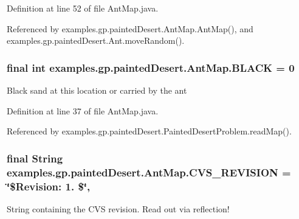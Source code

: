 Definition at line 52 of file Ant\-Map.\-java.



Referenced by examples.\-gp.\-painted\-Desert.\-Ant\-Map.\-Ant\-Map(), and examples.\-gp.\-painted\-Desert.\-Ant.\-move\-Random().

\hypertarget{classexamples_1_1gp_1_1painted_desert_1_1_ant_map_a93de6de82fae66c7bf8423d40669ece8}{
\subsubsection[{B\-L\-A\-C\-K}]{\setlength{\rightskip}{0pt plus 5cm}final int examples.\-gp.\-painted\-Desert.\-Ant\-Map.\-B\-L\-A\-C\-K = 0\hspace{0.3cm}{\ttfamily [static]}}}\label{classexamples_1_1gp_1_1painted_desert_1_1_ant_map_a93de6de82fae66c7bf8423d40669ece8}
Black sand at this location or carried by the ant 

Definition at line 37 of file Ant\-Map.\-java.



Referenced by examples.\-gp.\-painted\-Desert.\-Painted\-Desert\-Problem.\-read\-Map().

\hypertarget{classexamples_1_1gp_1_1painted_desert_1_1_ant_map_ab67ca8f36fdf6039656fe215f4c358e3}{
\subsubsection[{C\-V\-S\-\_\-\-R\-E\-V\-I\-S\-I\-O\-N}]{\setlength{\rightskip}{0pt plus 5cm}final String examples.\-gp.\-painted\-Desert.\-Ant\-Map.\-C\-V\-S\-\_\-\-R\-E\-V\-I\-S\-I\-O\-N = \char`\"{}\$Revision\-: 1. \$\char`\"{}\hspace{0.3cm}{\ttfamily [static]}, {\ttfamily [private]}}}\label{classexamples_1_1gp_1_1painted_desert_1_1_ant_map_ab67ca8f36fdf6039656fe215f4c358e3}
String containing the C\-V\-S revision. Read out via reflection! 

